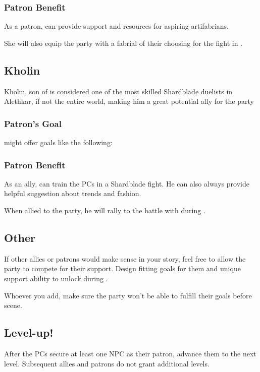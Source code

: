 
\subsubsection{Patron Benefit}

As a patron, \npcNavani{} can provide support and resources for aspiring artifabrians.

She will also equip the party with a fabrial of their choosing for the fight in .




\subsection{\npcAdolinName{}{} Kholin}

\npcAdolin{} Kholin, son of \npcDalinar{} is considered one of the most skilled Shardblade duelists in Alethkar, if not the entire world, making him a great potential ally for the party

\subsubsection{Patron's Goal}

\npcAdolin{} might offer goals like the following:


\subsubsection{Patron Benefit}

As an ally, \npcAdolin{} can train the PCs in a Shardblade fight. He can also always provide helpful suggestion about trends and fashion.

When allied to the party, he will rally to the battle with \npcMidnightMother{} during .




\subsection{Other}

If other allies or patrons would make sense in your story, feel free to allow the party to compete for their support. Design fitting goals for them and unique support ability to unlock during .

Whoever you add, make sure the party won't be able to fulfill their goals before  scene.



\subsection{Level-up!}

After the PCs secure at least one NPC as their patron, advance them to the next level. Subsequent allies and patrons do not grant additional levels.